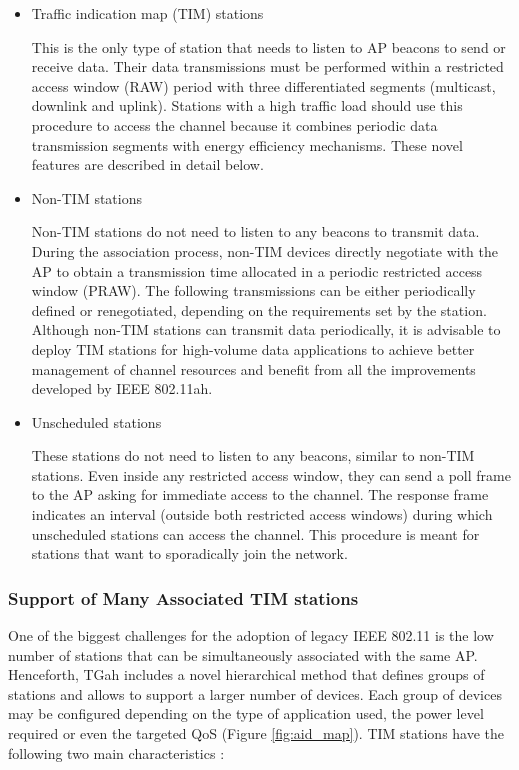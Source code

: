 \documentclass[]{article}
\begin{document}
\begin{itemize}

\item {Traffic indication map (TIM) stations}
\par This is the only type of station that needs to listen to AP beacons to send or receive data. Their data transmissions must be performed within a restricted access window (RAW) period with three differentiated segments (multicast, downlink and uplink). 
Stations with a high traffic load should use this procedure to access the channel because it combines periodic data transmission segments with energy efficiency mechanisms. These novel features are described in detail below.



\item {Non-TIM stations}
\par Non-TIM stations do not need to listen to any beacons to transmit data. During the association process, non-TIM devices directly negotiate with the AP to obtain a transmission time allocated in a periodic restricted access window (PRAW). The following transmissions can be either periodically defined or renegotiated, depending on the requirements set by the station. Although non-TIM stations can transmit data periodically, it is advisable to deploy TIM stations for high-volume data applications to achieve better management of channel resources and benefit from all the improvements developed by IEEE 802.11ah.

\item {Unscheduled stations}
\par These stations do not need to listen to any beacons, similar to non-TIM stations. Even inside any restricted access window, they can send a poll frame to the AP asking for immediate access to the channel. The response frame indicates an interval (outside both restricted access windows) during which unscheduled stations can access the channel. This procedure is meant for stations that want to sporadically join the network.

\end{itemize}

\subsubsection{Support of Many Associated TIM stations}

One of the biggest challenges for the adoption of legacy IEEE 802.11 is the low number of stations that can be simultaneously associated with the same AP. Henceforth, TGah includes a novel hierarchical method that defines groups of stations and allows to support a larger number of devices. Each group of devices may be configured depending on the type of application used, the power level required or even the targeted QoS (Figure \ref{fig:aid_map}). TIM stations have the following two main characteristics \cite{Draft802.11ah}:
\end{document}
